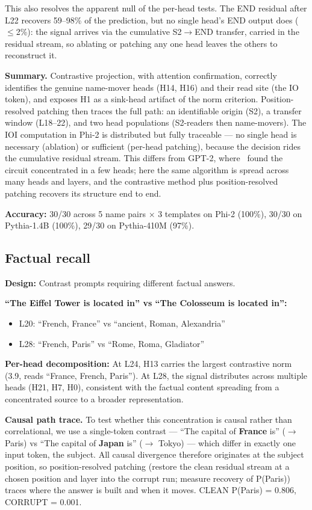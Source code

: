 \documentclass[11pt]{article}
\begin{document}
This also resolves the apparent null of the per-head tests. The END residual
after L22 recovers 59--98\% of the prediction, but no single head's END output
does ($\le$2\%): the signal arrives via the cumulative S2$\rightarrow$END transfer, carried in
the residual stream, so ablating or patching any one head leaves the others to
reconstruct it.

\textbf{Summary.} Contrastive projection, with attention confirmation, correctly
identifies the genuine name-mover heads (H14, H16) and their read site (the IO
token), and exposes H1 as a sink-head artifact of the norm criterion.
Position-resolved patching then traces the full path: an identifiable origin
(S2), a transfer window (L18--22), and two head populations (S2-readers then
name-movers). The IOI computation in Phi-2 is distributed but fully traceable ---
no single head is necessary (ablation) or sufficient (per-head patching),
because the decision rides the cumulative residual stream. This differs from
GPT-2, where~\citet{wang2023} found the circuit concentrated in a few heads; here the
same algorithm is spread across many heads and layers, and the contrastive
method plus position-resolved patching recovers its structure end to end.

\textbf{Accuracy:} 30/30 across 5 name pairs $\times$ 3 templates on Phi-2 (100\%),
30/30 on Pythia-1.4B (100\%), 29/30 on Pythia-410M (97\%).

\subsection{Factual recall}

\textbf{Design:} Contrast prompts requiring different factual answers.

\textbf{``The Eiffel Tower is located in'' vs ``The Colosseum is located in'':}
\begin{itemize}[leftmargin=*]
\item L20: ``French, France'' vs ``ancient, Roman, Alexandria''
\item L28: ``French, Paris'' vs ``Rome, Roma, Gladiator''
\end{itemize}

\textbf{Per-head decomposition:} At L24, H13 carries the largest contrastive norm
(3.9, reads ``France, French, Paris''). At L28, the signal distributes across
multiple heads (H21, H7, H0), consistent with the factual content spreading
from a concentrated source to a broader representation.

\textbf{Causal path trace.} To test whether this concentration is causal rather than
correlational, we use a single-token contrast --- ``The capital of \textbf{France} is''
($\rightarrow$ Paris) vs ``The capital of \textbf{Japan} is'' ($\rightarrow$ Tokyo) --- which differ in exactly
one input token, the subject. All causal divergence therefore originates at the
subject position, so position-resolved patching (restore the clean residual
stream at a chosen position and layer into the corrupt run; measure recovery of
P(Paris)) traces where the answer is built and when it moves. CLEAN P(Paris) =
0.806, CORRUPT = 0.001.
\end{document}
